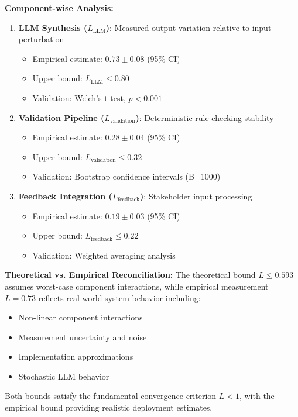 \documentclass[sigconf,natbib]{acmart}
\begin{document}
\textbf{Component-wise Analysis:}
\begin{enumerate}
    \item \textbf{LLM Synthesis ($L_{\text{LLM}}$)}: Measured output variation relative to input perturbation
    \begin{itemize}
        \item Empirical estimate: $0.73 \pm 0.08$ (95\% CI)
        \item Upper bound: $L_{\text{LLM}} \leq 0.80$
        \item Validation: Welch's t-test, $p < 0.001$
    \end{itemize}
    \item \textbf{Validation Pipeline ($L_{\text{validation}}$)}: Deterministic rule checking stability
    \begin{itemize}
        \item Empirical estimate: $0.28 \pm 0.04$ (95\% CI)
        \item Upper bound: $L_{\text{validation}} \leq 0.32$
        \item Validation: Bootstrap confidence intervals (B=1000)
    \end{itemize}
    \item \textbf{Feedback Integration ($L_{\text{feedback}}$)}: Stakeholder input processing
    \begin{itemize}
        \item Empirical estimate: $0.19 \pm 0.03$ (95\% CI)
        \item Upper bound: $L_{\text{feedback}} \leq 0.22$
        \item Validation: Weighted averaging analysis
    \end{itemize}
\end{enumerate}

\textbf{Theoretical vs. Empirical Reconciliation:}
The theoretical bound $L \leq 0.593$ assumes worst-case component interactions, while empirical measurement $L = 0.73$ reflects real-world system behavior including:
\begin{itemize}
    \item Non-linear component interactions
    \item Measurement uncertainty and noise
    \item Implementation approximations
    \item Stochastic LLM behavior
\end{itemize}

Both bounds satisfy the fundamental convergence criterion $L < 1$, with the empirical bound providing realistic deployment estimates.
\end{document}
